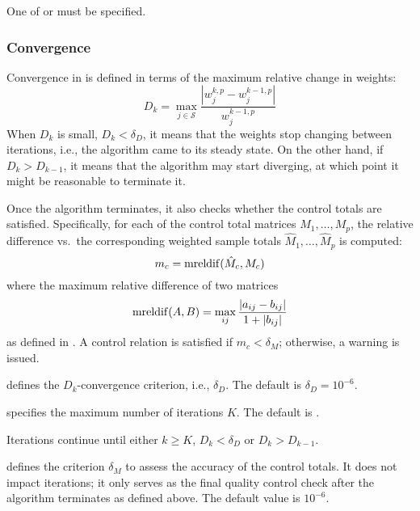 \morehang
One of  or  must be specified.

\subsubsection{Convergence}

\begin{sttech}
Convergence in  is defined in terms of the maximum relative
change in weights:
\begin{equation}
    D_k = \max_{j \in \mathcal{S}} \frac{|w_j^{k,p}-w_j^{k-1,p}|}{w_j^{k-1,p}}
    \label{eq:conv:ratio:weights}
\end{equation}
When $D_k$ is small, $D_k < \delta_D$, it means that the weights stop
changing between iterations, i.e., the algorithm came to its steady state.
On the other hand, if $D_k > D_{k-1}$, it means that the algorithm
may start diverging, at which point it might be reasonable to terminate it.

Once the algorithm terminates, it also checks whether the control totals
are satisfied. Specifically, for each of the control total matrices
$M_1, \ldots, M_p$, the relative difference vs.\ the corresponding weighted
sample totals $\hat M_1, \ldots, \hat M_p$ is computed:
\begin{equation}
    m_c = {\rm mreldif}( \hat M_c, M_c )
    \label{eq:conv:mreldif}
\end{equation}
where the maximum relative difference of two matrices
$$
{\rm mreldif}(A,B) = \max_{ij} \frac{|a_{ij}-b_{ij}|}{1+|b_{ij}|}
$$
as defined in . A control relation is satisfied
if $m_c < \delta_M$; otherwise, a warning is issued.

\end{sttech}

\hangpara
{} defines the $D_k$-convergence
criterion, i.e., $\delta_D$. The default is $\delta_D = 10^{-6}$.

\hangpara
{} specifies the maximum number
of iterations $K$.
The default is .

\morehang
Iterations continue until either $k \ge K$, $D_k < \delta_D$ or
$D_k > D_{k-1}$.

\hangpara
{} defines the criterion $\delta_M$ to
assess the accuracy of the control totals. It does not impact
iterations; it only serves as the final quality control check
after the algorithm terminates as defined above. The default value is $10^{-6}$.

